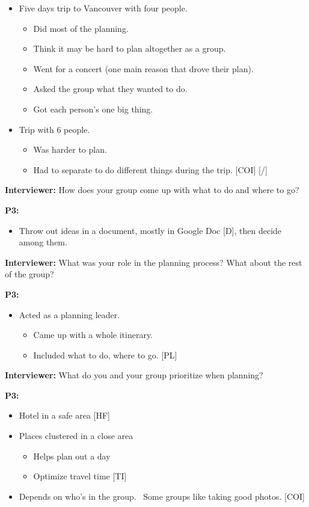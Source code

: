 \documentclass[12pt,a4paper]{article}
\begin{document}
\begin{itemize}
    \item Five days trip to Vancouver with four people. 
    \begin{itemize}
        \item Did most of the planning. 
        \item Think it may be hard to plan altogether as a group.
        \item Went for a concert (one main reason that drove their plan).
        \item Asked the group what they wanted to do.
        \item Got each person’s one big thing.
    \end{itemize}
    \item Trip with 6 people. 
    \begin{itemize}
        \item Was harder to plan.
        \item Had to separate to do different things during the trip. [COI] [/]
    \end{itemize}
\end{itemize}

\textbf{Interviewer: }How does your group come up with what to do and where to go?

\textbf{P3: }

\begin{itemize}
    \item Throw out ideas in a document, mostly in Google Doc [D], then decide among them. 
\end{itemize}

\textbf{Interviewer: }What was your role in the planning process? What about the rest of the group? 

\textbf{P3: }

\begin{itemize}
    \item Acted as a planning leader. 
    \begin{itemize}
        \item Came up with a whole itinerary.
        \item Included what to do, where to go. [PL]
    \end{itemize}
\end{itemize}

\textbf{Interviewer: }What do you and your group prioritize when planning? 

\textbf{P3: }

\begin{itemize}
    \item Hotel in a safe area [HF]
    \item Places clustered in a close area 
    \begin{itemize}
        \item Helps plan out a day
        \item Optimize travel time [TI]
    \end{itemize}
    \item Depends on who’s in the group. 
Some groups like taking good photos. [COI]

\end{itemize}
\end{document}
